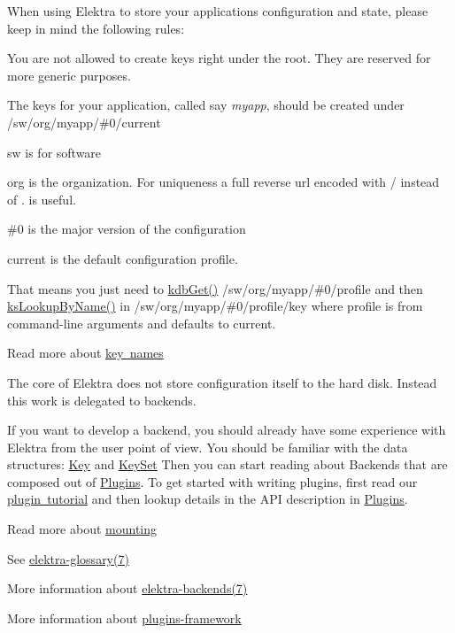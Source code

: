 When using Elektra to store your application\textquotesingle{}s configuration and state, please keep in mind the following rules\+:


\begin{DoxyItemize}
\item You are not allowed to create keys right under the root. They are reserved for more generic purposes.
\item The keys for your application, called say {\itshape myapp}, should be created under {\ttfamily /sw/org/myapp/\#0/current}
\begin{DoxyItemize}
\item sw is for software
\item org is the organization. For uniqueness a full reverse url encoded with \textquotesingle{}/\textquotesingle{} instead of \textquotesingle{}.\textquotesingle{} is useful.
\item {\ttfamily \#0} is the major version of the configuration
\item current is the default configuration profile.
\item That means you just need to \mbox{\hyperlink{group__kdb_ga28e385fd9cb7ccfe0b2f1ed2f62453a1}{kdb\+Get()}} {\ttfamily /sw/org/myapp/\#0/profile} and then \mbox{\hyperlink{group__keyset_gad2e30fb6d4739d917c5abb2ac2f9c1a1}{ks\+Lookup\+By\+Name()}} in {\ttfamily /sw/org/myapp/\#0/profile/key} where profile is from command-\/line arguments and defaults to current.
\end{DoxyItemize}
\end{DoxyItemize}

Read more about \mbox{\hyperlink{doc_help_elektra-key-names_md}{key names}}

The core of Elektra does not store configuration itself to the hard disk. Instead this work is delegated to backends.

If you want to develop a backend, you should already have some experience with Elektra from the user point of view. You should be familiar with the data structures\+: \mbox{\hyperlink{group__key}{Key}} and \mbox{\hyperlink{group__keyset}{Key\+Set}} Then you can start reading about Backends that are composed out of \mbox{\hyperlink{group__plugin}{Plugins}}. To get started with writing plugins, first read our \mbox{\hyperlink{doc_tutorials_plugins_md}{plugin tutorial}} and then lookup details in the A\+PI description in \mbox{\hyperlink{group__plugin}{Plugins}}.

Read more about \mbox{\hyperlink{doc_help_elektra-mounting_md}{mounting}}


\begin{DoxyItemize}
\item See \mbox{\hyperlink{doc_help_elektra-glossary_md}{elektra-\/glossary(7)}}
\item More information about \mbox{\hyperlink{doc_help_elektra-backends_md}{elektra-\/backends(7)}}
\item More information about \mbox{\hyperlink{doc_dev_plugins-framework_md}{plugins-\/framework}} 
\end{DoxyItemize}